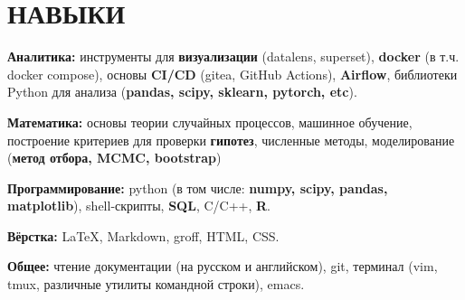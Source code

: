 \section{НАВЫКИ}

\begin{description}
  \setlength\itemsep{-0.4em}
  
\item{\bfseries Аналитика:} инструменты для \textbf{визуализации}
  (datalens, superset), \textbf{docker} (в т.ч. docker compose),
  основы \textbf{CI/CD} (gitea, GitHub Actions), \textbf{Airflow},
  библиотеки Python для анализа (\textbf{pandas, scipy, sklearn,
    pytorch, etc}).
  
\item{\bfseries Математика:} основы теории случайных процессов,
  машинное обучение, построение критериев для проверки
  \textbf{гипотез}, численные методы, моделирование (\textbf{метод
    отбора, MCMC, bootstrap})
  
\item{\bfseries Программирование:} python (в том числе: \textbf{numpy,
    scipy, pandas, matplotlib}), shell-скрипты, \textbf{SQL}, C/C++,
  \textbf{R}.
  
\item{\bfseries Вёрстка:} \LaTeX, Markdown, groff, HTML, CSS.
  
\item{\bfseries Общее:} чтение документации (на русском и английском),
  git, терминал (vim, tmux, различные утилиты командной строки), emacs.
\end{description}

